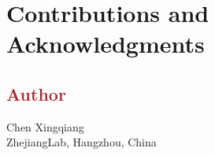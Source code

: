 \newpage
\section*{Contributions and Acknowledgments}

\subsection*{\textcolor{brown}{Author}}
Chen Xingqiang \\
ZhejiangLab, Hangzhou, China